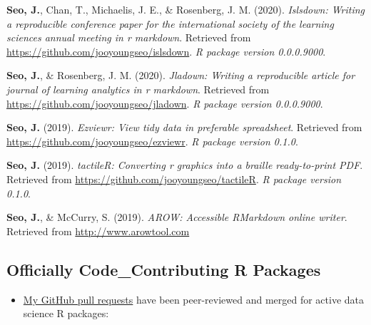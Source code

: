\documentclass[11pt,a4paper,]{awesome-cv}
\providecommand{\tightlist}{%
	\setlength{\itemsep}{0pt}\setlength{\parskip}{0pt}}
\begin{document}
\leavevmode{}%
\textbf{Seo, J.}, Chan, T., Michaelis, J. E., \& Rosenberg, J. M.
(2020). \emph{Islsdown: Writing a reproducible conference paper for the
international society of the learning sciences annual meeting in r
markdown}. Retrieved from \url{https://github.com/jooyoungseo/islsdown}.
\emph{R package version 0.0.0.9000}.

\leavevmode{}%
\textbf{Seo, J.}, \& Rosenberg, J. M. (2020). \emph{Jladown: Writing a
reproducible article for journal of learning analytics in r markdown}.
Retrieved from \url{https://github.com/jooyoungseo/jladown}. \emph{R
package version 0.0.0.9000}.

\leavevmode{}%
\textbf{Seo, J.} (2019). \emph{Ezviewr: View tidy data in preferable
spreadsheet}. Retrieved from
\url{https://github.com/jooyoungseo/ezviewr}. \emph{R package version
0.1.0}.

\leavevmode{}%
\textbf{Seo, J.} (2019). \emph{tactileR: Converting r graphics into a
braille ready-to-print PDF}. Retrieved from
\url{https://github.com/jooyoungseo/tactileR}. \emph{R package version
0.1.0}.

\leavevmode{}%
\textbf{Seo, J.}, \& McCurry, S. (2019). \emph{AROW: Accessible
RMarkdown online writer}. Retrieved from \url{http://www.arowtool.com}

\hypertarget{officially-code_contributing-r-packages}{%
\subsection{Officially Code\_Contributing R
Packages}\label{officially-code_contributing-r-packages}}

\begin{itemize}
\tightlist
\item
  \href{https://github.com/pulls?q=is\%3Apr+author\%3Ajooyoungseo+archived\%3Afalse+is\%3Aclosed}{My
  GitHub pull requests} have been peer-reviewed and merged for active
  data science R packages:
\end{itemize}
\end{document}
